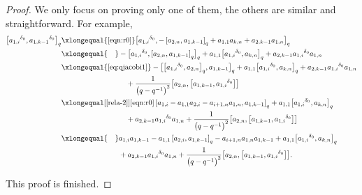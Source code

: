 \documentclass[pdftex]{sigma}
\numberwithin{equation}{section}
\def\lr#1{\left[#1\right]}
\def\d{\delta}
\begin{document}
\begin{proof}
We only focus on proving only one of them, the others are similar and straightforward.
For example,
\begin{align*}
\bigl[{a_{1,i}}^{\d_0},{a_{1,k-1}}^{\d_0}\bigr]_q&
\xlongequal{\eqref{eqn:r0}}\bigl[{a_{1,i}}^{\d_0},-\lr{a_{2,n},a_{1,k-1}}_q+a_{1,1}a_{k,n}+a_{2,k-1}a_{1,n}\bigr]_q\\
&\xlongequal{\quad}-\bigl[{a_{1,i}}^{\d_0},\lr{a_{2,n},a_{1,k-1}}_q\bigr]_q +a_{1,1}\bigl[{a_{1,i}}^{\d_0},a_{k,n}\bigr]_q +a_{2,k-1}{a_{1,i}}^{\d_0}a_{1,n}\\
&\xlongequal{\eqref{eq:qjacobi1}}-\bigl[\bigl[{a_{1,i}}^{\d_0},a_{2,n}\bigr]_q,a_{1,k-1}\bigr]_q+a_{1,1}\bigl[{a_{1,i}}^{\d_0},a_{k,n}\bigr]_q
+a_{2,k-1}{a_{1,i}}^{\d_0}a_{1,n}\\
&\phantom{\xlongequal{\qquad}}{}+\frac{1}{\bigl(q-q^{-1}\bigr)^2}\bigl[a_{2,n}, \bigl[a_{1,k-1}, {a_{1,i}}^{\d_0}\bigr]\bigr]\\
&\xlongequal[\eqref{rela-2}]{\eqref{eqn:r0}}\lr{a_{1,i}-a_{1,1}a_{2,i}-a_{i+1,n}a_{1,n},a_{1,k-1}}_q+a_{1,1}\bigl[{a_{1,i}}^{\d_0},a_{k,n}\bigr]_q \\
&\phantom{\xlongequal{\qquad}}{}+a_{2,k-1}{a_{1,i}}^{\d_0}a_{1,n}+\frac{1}{\bigl(q-q^{-1}\bigr)^2}\bigl[a_{2,n}, \bigl[a_{1,k-1}, {a_{1,i}}^{\d_0}\bigr] \bigr]\\
&\xlongequal{\quad }a_{1,i}a_{1,k-1}-a_{1,1}\lr{a_{2,i},a_{1,k-1}}_q-a_{i+1,n}a_{1,n}a_{1,k-1} +a_{1,1}\bigl[{a_{1,i}}^{\d_0},a_{k,n}\bigr]_q\\
&\phantom{\xlongequal{\quad }}{}+a_{2,k-1}{a_{1,i}}^{\d_0}a_{1,n}+\frac{1}{\bigl(q-q^{-1}\bigr)^2}\bigl[a_{2,n}, \bigl[a_{1,k-1}, {a_{1,i}}^{\d_0}\bigr]\bigr].
\end{align*}

This proof is finished.
\end{proof}
\end{document}
